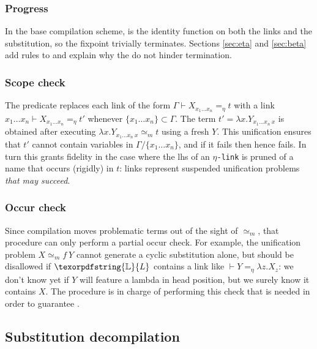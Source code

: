 \documentclass[sigconf,natbib=false,review]{acmart}
\newcommand{\UnifRel}{\ensuremath{\simeq}}
\newcommand{\Ue}{\ensuremath{\UnifRel_m}\xspace}
\newcommand{\linkMacro}[1]{\ensuremath{#1}\texttt{-link}\xspace}
\newcommand{\linketa} {\linkMacro{\eta}}
\newcommand{\linketaM}[3]{\ensuremath{#1 \vdash #2 =_\eta #3}}
\newcommand{\lhs}{lhs\xspace}
\newcommand{\linkStore}{\texorpdfstring{\ensuremath{\mathbb{L}}\xspace}{L}}
\begin{document}


\subsubsection{Progress}
In the base compilation scheme,  is the identity function
on both the links and the substitution, so the fixpoint trivially terminates.
Sections \ref{sec:eta} and \ref{sec:beta} add rules to 
and explain why the do not hinder termination.

\subsubsection{Scope check}\label{sec:sc}
The predicate  
replaces each
link of the form \linketaM{\Gamma}{X_{x_1\ldots x_n}}{t} with
a link
\linketaM{{x_1\ldots x_n}}{X_{x_1\ldots x_n}}{t'} whenever $\{x_1\ldots x_n\} \subset \Gamma$.
The term $t' = \lambda x.Y_{{x_1\ldots x_n}~x}$ is obtained after
executing $\lambda x.Y_{{x_1\ldots x_n}~x} \Ue t$ using a fresh $Y$.
This unification
ensures that $t'$ cannot contain variables in $\Gamma / \{x_1\ldots x_n\}$,
and if it fails then \progress hence \hstep fails.
In turn this grants fidelity in the case where the \lhs of an \linketa
is pruned of a name that occurs (rigidly) in $t$:
links represent suspended unification problems
\emph{that may succeed}.

\subsubsection{Occur check}\label{sec:oc}
Since compilation moves problematic terms out of the sight of \Ue{},
that procedure can only perform a partial occur check. For example, the
unification problem $X \Ue f~Y$ cannot generate a cyclic substitution alone,
but should be disallowed if $\linkStore$ contains a link like
$\linketaM{}{Y}{\lambda z.X_z}$: we don't know yet if $Y$ will feature
a lambda in head position, but we surely know it contains $X$.
The procedure  is in charge of
performing this check that is needed in order to
guarantee .


\subsection{Substitution decompilation}\label{sec:decompilation}
\end{document}
